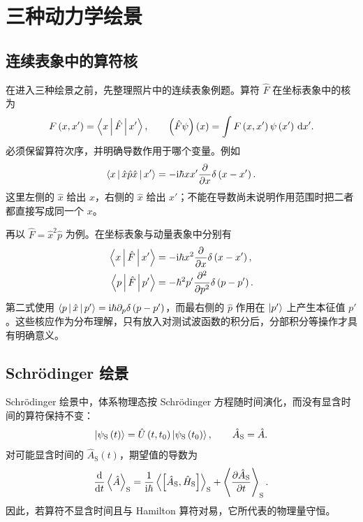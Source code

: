 \section{三种动力学绘景}
\subsection{连续表象中的算符核}
在进入三种绘景之前，先整理照片中的连续表象例题。算符 $\hat F$ 在坐标表象中的核为
\begin{equation}
F\left(x,x'\right)=\Braket{x|\hat F|x'},
\qquad
\left(\hat F\psi\right)\left(x\right)
=\int F\left(x,x'\right)\psi\left(x'\right)\,\mathrm{d}x'.
\end{equation}
必须保留算符次序，并明确导数作用于哪个变量。例如
\begin{equation}
\Braket{x|\hat x\hat p\hat x|x'}
=-\mathrm{i}\hbar xx'\frac{\partial}{\partial x}\delta\left(x-x'\right).
\end{equation}
这里左侧的 $\hat x$ 给出 $x$，右侧的 $\hat x$ 给出 $x'$；不能在导数尚未说明作用范围时把二者都直接写成同一个 $x$。

再以 $\hat F=\hat x^2\hat p$ 为例。在坐标表象与动量表象中分别有
\begin{align}
\Braket{x|\hat F|x'}
&=-\mathrm{i}\hbar x^2\frac{\partial}{\partial x}\delta\left(x-x'\right),\\
\Braket{p|\hat F|p'}
&=-\hbar^2p'\frac{\partial^2}{\partial p^2}\delta\left(p-p'\right).
\end{align}
第二式使用 $\Braket{p|\hat x|p'}=\mathrm{i}\hbar\partial_p\delta\left(p-p'\right)$，而最右侧的 $\hat p$ 作用在 $\Ket{p'}$ 上产生本征值 $p'$。这些核应作为分布理解，只有放入对测试波函数的积分后，分部积分等操作才具有明确意义。

\subsection{Schr\"odinger 绘景}
Schr\"odinger 绘景中，体系物理态按 Schr\"odinger 方程随时间演化，而没有显含时间的算符保持不变：
\begin{equation}
\Ket{\psi_{\mathrm{S}}\left(t\right)}=\hat U\left(t,t_0\right)
\Ket{\psi_{\mathrm{S}}\left(t_0\right)},
\qquad \hat A_{\mathrm{S}}=\hat A.
\end{equation}
对可能显含时间的 $\hat A_{\mathrm{S}}\left(t\right)$，期望值的导数为
\begin{equation}
\frac{\mathrm{d}}{\mathrm{d}t}\Braket{\hat A}_{\mathrm{S}}
=\frac{1}{\mathrm{i}\hbar}\Braket{\left[\hat A_{\mathrm{S}},\hat H_{\mathrm{S}}\right]}_{\mathrm{S}}
+\Braket{\frac{\partial\hat A_{\mathrm{S}}}{\partial t}}_{\mathrm{S}}.
\label{eq:expectation-evolution}
\end{equation}
因此，若算符不显含时间且与 Hamilton 算符对易，它所代表的物理量守恒。

